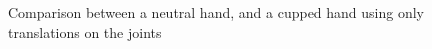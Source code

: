 \documentclass{uva-inf-article}
\begin{document}
\begin{figure}[hbt!]
    \centering
    \qquad
    \caption{Comparison between a neutral hand, and a cupped hand using only translations on the joints}%
    \label{fig:cuppedNonCupped}%
\end{figure}

\printbibliography



\end{document}
